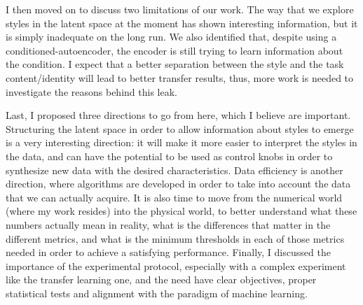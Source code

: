   \par I then moved on to discuss two limitations of our work. The way that we explore styles in the latent space at the moment has shown interesting information, but it is simply inadequate on the long run. We also identified that, despite using a conditioned-autoencoder, the encoder is still trying to learn information about the condition. I expect that a better separation between the style and the task content/identity will lead to better transfer results, thus, more work is needed to investigate the reasons behind this leak.

  \par Last, I proposed three directions to go from here, which I believe are important. Structuring the latent space in order to allow information about styles to emerge is a very interesting direction: it will make it more easier to interpret the styles in the data, and can have the potential to be used as control knobs in order to synthesize new data with the desired characteristics. Data efficiency is another direction, where algorithms are developed in order to take into account the data that we can actually acquire. It is also time to move from the numerical world (where my work resides) into the physical world, to better understand what these numbers actually mean in reality, what is the differences that matter in the different metrics, and what is the minimum thresholds in each of those metrics needed in order to achieve a satisfying performance. Finally, I discussed the importance of the experimental protocol, especially with a complex experiment like the transfer learning one, and the need have clear objectives, proper statistical tests and alignment with the paradigm of machine learning.

